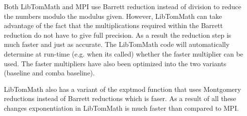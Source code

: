 \documentclass{article}
\begin{document}
Both LibTomMath and MPI use Barrett reduction instead of division to reduce the numbers modulo the modulus given.
However, LibTomMath can take advantage of the fact that the multiplications required within the Barrett reduction
do not have to give full precision.  As a result the reduction step is much faster and just as accurate.  The LibTomMath code
will automatically determine at run-time (e.g. when its called) whether the faster multiplier can be used.  The
faster multipliers have also been optimized into the two variants (baseline and comba baseline).

LibTomMath also has a variant of the exptmod function that uses Montgomery reductions instead of Barrett reductions
which is faser.  As a result of all these changes exponentiation in LibTomMath is much faster than compared to MPI.  
\end{document}
